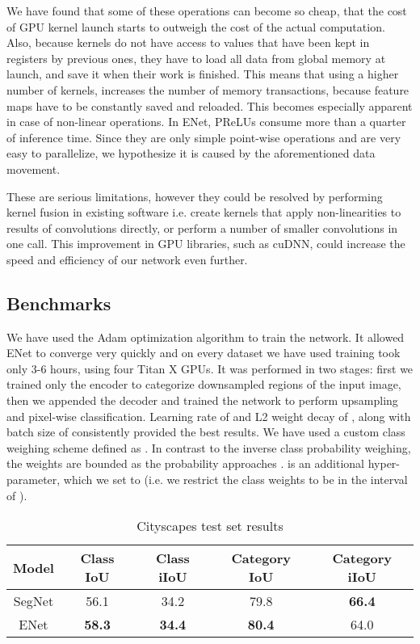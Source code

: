 \documentclass{article}
\begin{document}
We have found that some of these operations can become so cheap, that the cost of GPU kernel launch starts to outweigh the cost of the actual computation.
Also, because kernels do not have access to values that have been kept in registers by previous ones, they have to load all data from global memory at launch, and save it when their work is finished.
This means that using a higher number of kernels, increases the number of memory transactions, because feature maps have to be constantly saved and reloaded.
This becomes especially apparent in case of non-linear operations.
In ENet, PReLUs consume more than a quarter of inference time.
Since they are only simple point-wise operations and are very easy to parallelize, we hypothesize it is caused by the aforementioned data movement.

These are serious limitations, however they could be resolved by performing kernel fusion in existing software i.e. create kernels that apply non-linearities to results of convolutions directly, or perform a number of smaller convolutions in one call.
This improvement in GPU libraries, such as cuDNN, could increase the speed and efficiency of our network even further.

\subsection{Benchmarks}

We have used the Adam optimization algorithm \cite{diederik14} to train the network.
It allowed ENet to converge very quickly and on every dataset we have used training took only 3-6 hours, using four Titan X GPUs.
It was performed in two stages: first we trained only the encoder to categorize downsampled regions of the input image, then we appended the decoder and trained the network to perform upsampling and pixel-wise classification.
Learning rate of  and L2 weight decay of , along with batch size of  consistently provided the best results.
We have used a custom class weighing scheme defined as .
In contrast to the inverse class probability weighing, the weights are bounded as the probability approaches .
 is an additional hyper-parameter, which we set to  (i.e. we restrict the class weights to be in the interval of ).

\begin{table}[htb]
  \small
  \caption{Cityscapes test set results}
  \vspace{0.05in}
  \label{tab:cityscape}
  \centering
  \begin{tabular}{ c c c c c }
    \toprule
    Model           &Class IoU      &Class iIoU     &Category IoU  &Category iIoU \\
    \midrule
    SegNet          &56.1           &34.2           &79.8          &\textbf{66.4} \\
    ENet            &\textbf{58.3}  &\textbf{34.4}  &\textbf{80.4} &64.0          \\
    \bottomrule
  \end{tabular}
\end{table}
\end{document}
